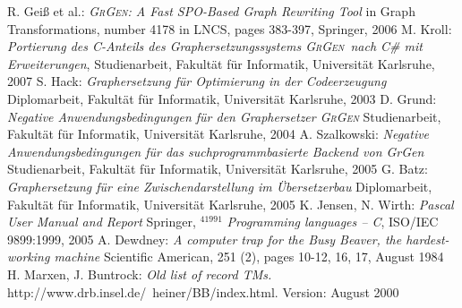 \documentclass[a4paper,11pt]{book}
\providecommand{\GrG}{{\scshape GrGen}}
\newcounter{example}
\begin{document}


 R. Geiß et al.: \emph{\GrG: A Fast SPO-Based Graph Rewriting Tool} in Graph Transformations, number 4178 in LNCS, pages 383-397, Springer, 2006
 M. Kroll: \emph{Portierung des C-Anteils des Graphersetzungssystems \GrG\ nach C\# mit Erweiterungen}, Studienarbeit, Fakultät für Informatik, Universität Karlsruhe, 2007
 S. Hack: \emph{Graphersetzung für Optimierung in der Codeerzeugung} Diplomarbeit, Fakultät für Informatik, Universität Karlsruhe, 2003
 D. Grund: \emph{Negative Anwendungsbedingungen für den Graphersetzer \GrG} Studienarbeit, Fakultät für Informatik, Universität Karlsruhe, 2004 
 A. Szalkowski: \emph{Negative Anwendungsbedingungen für das suchprogrammbasierte Backend von GrGen} Studienarbeit, Fakultät für Informatik, Universität Karlsruhe, 2005
 G. Batz: \emph{Graphersetzung für eine Zwischendarstellung im Übersetzerbau} Diplomarbeit, Fakultät für Informatik, Universität Karlsruhe, 2005
 K. Jensen, N. Wirth: \emph{Pascal User Manual and Report} Springer, $^41991$
 \emph{Programming languages -- C}, ISO/IEC 9899:1999, 2005
 A. Dewdney: \emph{A computer trap for the Busy Beaver, the hardest-working machine} Scientific American, 251
(2), pages 10-12, 16, 17, August 1984
 H. Marxen, J. Buntrock: \emph{Old list of record TMs.}\\ http://www.drb.insel.de/~heiner/BB/index.html. Version: August 2000
\end{document}
